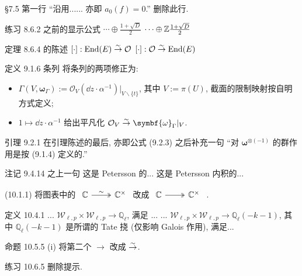 \documentclass{AJerrata}
\newcommand{\bomega}{\symbf{\omega}}	%
\begin{document}
\begin{Errata}
		\item[\S 7.5 第一行 ``沿用...... 亦即 $a_0(f)=0$.'']
		删除此行.
		
		\item[练习 8.6.2 之前的显示公式]
		\Orig $\cdots \oplus \frac{1 + \sqrt{D}}{2}$
		\Corr $\cdots \oplus \mathbb{Z} \frac{1 + \sqrt{D}}{2}$
		
		\item[定理 8.6.4 的陈述]
		\Orig $[\cdot]: \operatorname{End}(E) \stackrel{\sim}{\rightarrow} \mathcal{O}$
		\Corr $[\cdot]: \mathcal{O} \stackrel{\sim}{\rightarrow} \operatorname{End}(E)$
		
		\item[定义 9.1.6 条列]
		将条列的两项修正为:
		\begin{itemize}
			\item $\Gamma(V, \bomega_\Gamma) := \mathcal{O}_V (\dd z \cdot \alpha^{-1}) |_{V \smallsetminus \{t\}}$, 其中 $V := \pi(U)$, 截面的限制映射按自明方式定义;
			\item $1 \mapsto \dd z \cdot \alpha^{-1}$ 给出平凡化 $\mathcal{O}_V \rightiso \bomega_\Gamma |_V$.
		\end{itemize}
		
		\item[引理 9.2.1]
		在引理陈述的最后, 亦即公式 (9.2.3) 之后补充一句 ``对 $\bomega^{\otimes (-1)}$ 的群作用是按 (9.1.4) 定义的.''

		\item[注记 9.4.14 之上一句]
		\Orig 这是 Petersson 的...
		\Corr 这是 Petersson 内积的...
		
		\item[(10.1.1)] 将图表中的
		$\begin{tikzcd} \mathbb{C} \arrow[twoheadrightarrow, r, "\sim"] & \mathbb{C}^\times \end{tikzcd}$
		改成
		$\begin{tikzcd} \mathbb{C} \arrow[twoheadrightarrow, r] & \mathbb{C}^\times \end{tikzcd}$ .

		\item[定义 10.4.1]
		\Orig ... $\mathcal{W}_{\ell, p} \times \mathcal{W}_{\ell, p} \to \mathbb{Q}_\ell$, 满足 ...
		\Corr ... $\mathcal{W}_{\ell, p} \times \mathcal{W}_{\ell, p} \to \mathbb{Q}_\ell(-k-1)$, 其中 $\mathbb{Q}_\ell(-k-1)$ 是所谓的 Tate 挠 (仅影响 Galois 作用), 满足...
		
		\item[命题 10.5.5 (i)]
		将第二个 $\to$ 改成 $\stackrel{\sim}{\rightarrow}$.
		
		\item[练习 10.6.5]
		删除提示.
		

\end{Errata}
\end{document}
